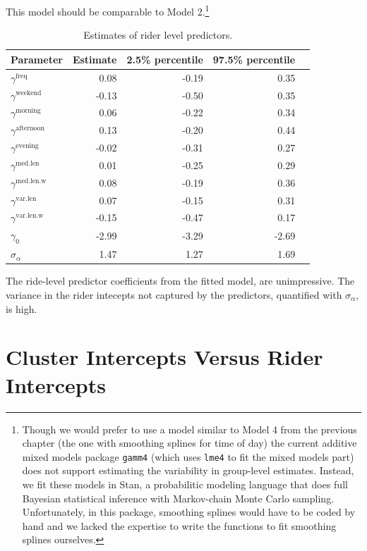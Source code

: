 \documentclass[12pt,twoside]{reedthesis}
\begin{document}
  This model should be comparable to Model 2.\footnote{Though we would
    prefer to use a model similar to Model 4 from the previous chapter
    (the one with smoothing splines for time of day) the current additive
    mixed models package \texttt{gamm4} (which uses \texttt{lme4} to fit
    the mixed models part) does not support estimating the variability in
    group-level estimates. Instead, we fit these models in Stan, a
    probabilitic modeling language that does full Bayesian statistical
    inference with Markov-chain Monte Carlo sampling. Unfortunately, in
    this package, smoothing splines would have to be coded by hand and we
    lacked the expertise to write the functions to fit smoothing splines
    ourselves.}
  
  \begin{table}[htb]
  \caption{Estimates of rider level predictors. \label{tab:rider-level-estimates}}
  \centering
  \begin{tabular}{lrrrr}
  \toprule
  \textbf{Parameter} & Estimate & 2.5\% percentile & 97.5\% percentile\\
  \midrule
  $\gamma^\text{freq}$ & 0.08 & -0.19 & 0.35\\
  $\gamma^\text{weekend}$ & -0.13 & -0.50 & 0.35\\
  $\gamma^\text{morning}$ & 0.06 & -0.22 & 0.34\\
  $\gamma^\text{afternoon}$ & 0.13 & -0.20 & 0.44\\
  $\gamma^\text{evening}$ & -0.02 & -0.31 & 0.27\\
  $\gamma^\text{med.len}$ & 0.01 & -0.25 & 0.29\\
  $\gamma^\text{med.len.w}$ & 0.08 & -0.19 & 0.36\\
  $\gamma^\text{var.len}$ & 0.07 & -0.15 & 0.31\\
  $\gamma^\text{var.len.w}$ & -0.15 & -0.47 & 0.17\\
  $\gamma_0$ & -2.99 & -3.29 & -2.69\\
  $\sigma_\alpha$ & 1.47 & 1.27 & 1.69\\
  \bottomrule
  \end{tabular}
  \end{table}
  
  The ride-level predictor coefficients from the fitted model, are
  unimpressive. The variance in the rider intecepts not captured by the
  predictors, quantified with \(\sigma_\alpha\), is high.
  
  \section{Cluster Intercepts Versus Rider
  Intercepts}\label{cluster-intercepts-versus-rider-intercepts}
  
\end{document}
